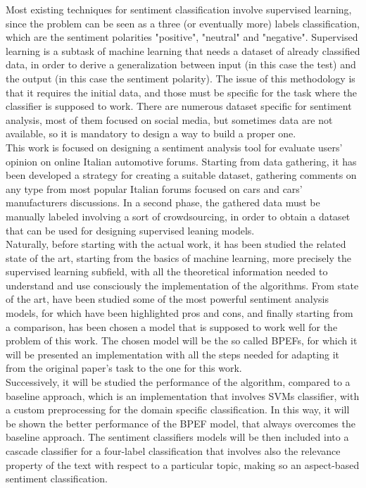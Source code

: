 Most existing techniques for sentiment classification involve supervised learning, since the problem can be seen as a three (or eventually more) labels classification, which are the sentiment polarities "positive", "neutral" and "negative". Supervised learning is a subtask of machine learning that needs a dataset of already classified data, in order to derive a generalization between input (in this case the test) and the output (in this case the sentiment polarity). The issue of this methodology is that it requires the initial data, and those must be specific for the task where the classifier is supposed to work. There are numerous dataset specific for sentiment analysis, most of them focused on social media, but sometimes data are not available, so it is mandatory to design a way to build a proper one.\\
This work is focused on designing a sentiment analysis tool for evaluate users' opinion on online Italian automotive forums. Starting from data gathering, it has been developed a strategy for creating a suitable dataset, gathering comments on any type from most popular Italian forums focused on cars and cars' manufacturers discussions. In a second phase, the gathered data must be manually labeled involving a sort of crowdsourcing, in order to obtain a dataset that can be used for designing supervised leaning models.\\
Naturally, before starting with the actual work, it has been studied the related state of the art, starting from the basics of machine learning, more precisely the supervised learning subfield, with all the theoretical information needed to understand and use consciously the implementation of the algorithms. From state of the art, have been studied some of the most powerful sentiment analysis models, for which have been highlighted pros and cons, and finally starting from a comparison, has been chosen a model that is supposed to work well for the problem of this work. The chosen model will be the so called \aclp{BPEF}, for which it will be presented an implementation with all the steps needed for adapting it from the original paper's task to the one for this work.\\
Successively, it will be studied the performance of the algorithm, compared to a baseline approach, which is an implementation that involves \aclp{SVM} classifier, with a custom preprocessing for the domain specific classification. In this way, it will be shown the better performance of the \ac{BPEF} model, that always overcomes the baseline approach. The sentiment classifiers models will be then included into a cascade classifier for a four-label classification that involves also the relevance property of the text with respect to a particular topic, making so an aspect-based sentiment classification.\\
